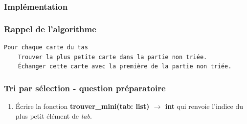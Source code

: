 \documentclass[svgnames,11pt]{beamer}
\begin{document}
\subsubsection{Implémentation}
\begin{frame}[fragile]
    \frametitle{Rappel de l'algorithme}
    \begin{center}
        \begin{lstlisting}[language=bash, basicstyle=\small,xleftmargin=2em,xrightmargin=2em]
Pour chaque carte du tas
    Trouver la plus petite carte dans la partie non triée.
    Échanger cette carte avec la première de la partie non triée.
\end{lstlisting}
        \label{CODE}
    \end{center}
\end{frame}
\begin{frame}
    \frametitle{Tri par sélection - question préparatoire}

    \begin{activite}
        \begin{enumerate}
            \item Écrire la fonction \textbf{trouver\_mini(tab: list) $\rightarrow$ int} qui renvoie l'indice du plus petit élément de \emph{tab}.
        \end{enumerate}
    \end{activite}

\end{frame}
\end{document}
